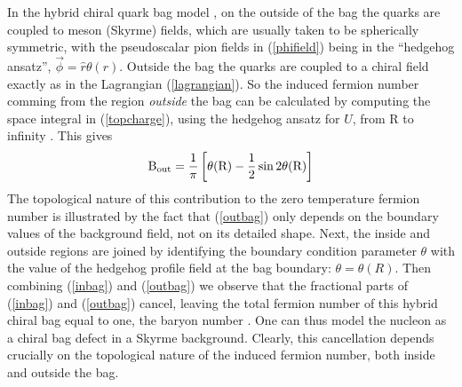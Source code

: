 \documentclass[a4paper,prd,showpacs,showkeys]{revtex4}
\begin{document}
{{In the hybrid chiral quark bag model \cite{jaffe,bhaduri}, on the outside of the bag the quarks are coupled to meson (Skyrme) fields, which are usually taken to be spherically symmetric, with the pseudoscalar pion fields in (\ref{phifield}) being in  the ``hedgehog ansatz'',  $\vec{\phi}=\hat{r} \theta(r)$. Outside the bag the quarks are coupled to a chiral field exactly as in the Lagrangian (\ref{lagrangian}). So the induced fermion number comming from the region  {\it outside} the bag can be calculated by computing the space integral in (\ref{topcharge}), using the hedgehog ansatz for $U$, from R to infinity \cite{jaffe}. This gives 
\begin{equation}
\textrm{B}_{\rm{out}}=\frac{1}{\pi}\left[ \theta (\rm{R})-\frac{1}{2} \sin 2 \theta (\rm{R}) \right] 
\label{outbag} 
\end{equation}
The topological nature of this contribution to the zero temperature fermion number is illustrated by the fact that (\ref{outbag}) only depends on the boundary values of the background field, not on its detailed shape. Next, the inside and outside regions are joined by identifying the boundary condition parameter $\theta$ with the value of the hedgehog profile field at the bag boundary: $\theta=\theta(R)$. 
Then combining (\ref{inbag}) and  (\ref{outbag}) we observe that the fractional parts of (\ref{inbag}) and (\ref{outbag}) cancel,  leaving the total fermion number of this hybrid chiral bag equal to one, the baryon number \cite{jaffe}. One can thus model the nucleon as a chiral bag defect in a Skyrme background. Clearly, this cancellation depends crucially on the topological nature of the induced fermion number, both inside and outside the bag.

}}
\end{document}
